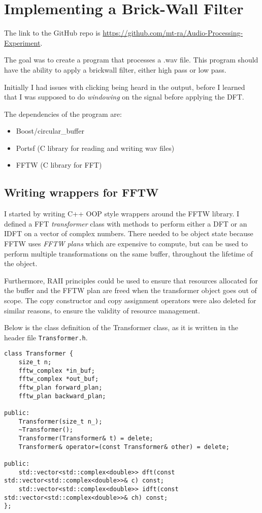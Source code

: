 \section{Implementing a Brick-Wall Filter}

The link to the GitHub repo is \href{https://github.com/mt-ra/Audio-Processing-Experiment}{https://github.com/mt-ra/Audio-Processing-Experiment}.

The goal was to create a program that processes a .wav file. 
This program should have the ability to apply a brickwall filter, 
either high pass or low pass.

Initially I had issues with clicking being heard in the output, 
before I learned that I was supposed to do \emph{windowing} on the signal before
applying the DFT.

The dependencies of the program are:
\begin{itemize}
    \item Boost/circular\_buffer
    \item Portsf (C library for reading and writing wav files)
    \item FFTW (C library for FFT)
\end{itemize}

\subsection{Writing wrappers for FFTW}
I started by writing C++ OOP style wrappers around the FFTW library. 
I defined a FFT \emph{transformer} class with methods to perform either a DFT or an IDFT on a vector of complex numbers.
There needed to be object state because FFTW uses \emph{FFTW plans} which are expensive to compute, but
can be used to perform multiple transformations on the same buffer, throughout the lifetime of the object.

Furthermore, RAII principles could be used to ensure that resources allocated for the buffer and the FFTW 
plan are freed when the transformer object goes out of scope.
The copy constructor and copy assignment operators were also deleted for similar reasons,
to ensure the validity of resource management.

Below is the class definition of the Transformer class, as it is written in the header file \verb|Transformer.h|.
\begin{verbatim}
class Transformer {
    size_t n;
    fftw_complex *in_buf;
    fftw_complex *out_buf;
    fftw_plan forward_plan;
    fftw_plan backward_plan;

public:
    Transformer(size_t n_);
    ~Transformer();
    Transformer(Transformer& t) = delete;
    Transformer& operator=(const Transformer& other) = delete;

public:
    std::vector<std::complex<double>> dft(const std::vector<std::complex<double>>& c) const;
    std::vector<std::complex<double>> idft(const std::vector<std::complex<double>>& ch) const;
};
\end{verbatim}

